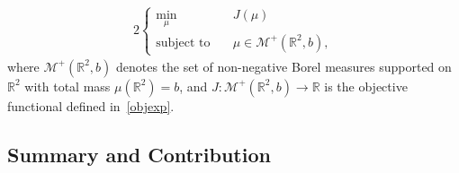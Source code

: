 \documentclass[stsy,sglanonrev]{informs4}
\begin{document}
\begin{alignat}{2}
\begin{cases}
\min\limits_{\mu} & \quad J(\mu) \\
\text{subject to} & \quad \mu \in \mathcal{M}^+(\mathbb{R}^2, b), \tag{$P_0$}
\end{cases}
\label{mainopt}
\end{alignat}
where \( \mathcal{M}^+(\mathbb{R}^2, b) \) denotes the set of non-negative Borel measures supported on \( \mathbb{R}^2 \) with total mass \( \mu(\mathbb{R}^2) = b \), and \( J : \mathcal{M}^+(\mathbb{R}^2, b) \to \mathbb{R} \) is the objective functional defined in~\eqref{objexp}. 

\subsection{Summary and Contribution}
\end{document}
